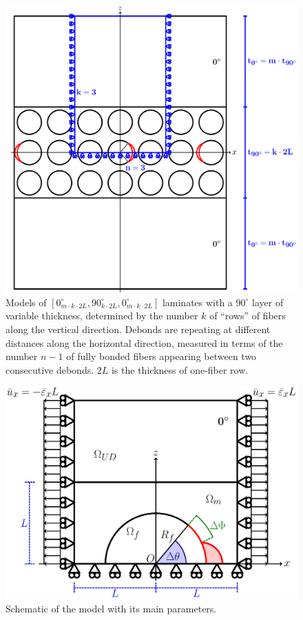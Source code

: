 \documentclass[review]{elsarticle}
\begin{document}
\begin{figure}[!htb]
\centering
        \includegraphics[height=0.425\textheight]{ThickPly.pdf}
\caption{Models of $\left[0_{m\cdot k\cdot2L}^{\circ},90_{k\cdot2L}^{\circ},0_{m\cdot k\cdot2L}^{\circ}\right]$ laminates with a $90^{\circ}$ layer of variable thickness, determined by the number $k$ of ``rows'' of fibers along the vertical direction.  Debonds are repeating at different distances along the horizontal direction, measured in terms of the number $n-1$ of fully bonded fibers appearing between two consecutive debonds. $2L$ is the thickness of one-fiber row.}\label{fig:laminateModelsB}
\end{figure}

\begin{figure}[!htb]
\centering
        \includegraphics[height=0.375\textheight]{RUC.pdf}
\caption{Schematic of the model with its main parameters.}\label{fig:modelschem}
\end{figure}
\end{document}
